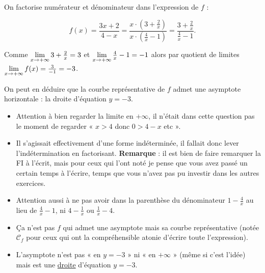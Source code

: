 \documentclass[a4paper,12pt,reqno,french]{article}
\begin{document}
	\begin{correc}
		
		On factorise numérateur et dénominateur	dans l'expression de $f$ :
		
		\[
			f(x) = \frac{3x+2}{4-x} = \frac{x \cdot \left( 3+\frac{2}{x}\right)}{x \cdot \left(\frac{4}{x} - 1\right)} = \frac{3+\frac{2}{x}}{\frac{4}{x} - 1} \text{.}
		\]
		
		Comme $\lim\limits_{x \to +\infty} 3+\frac{2}{x} = 3$ et $\lim\limits_{x \to +\infty} \frac{4}{x} - 1 = -1$ alors par quotient de limites $\lim\limits_{x \to +\infty} f(x) = \frac{3}{-1} = -3$.
		
		On peut en déduire que la courbe représentative de $f$ admet une asymptote horizontale : la droite d'équation $y=-3$.
		
	\end{correc}
	
	\begin{rqs}
			
		\begin{itemize}
			
			\item Attention à bien regarder la limite en $+\infty$, il n'était dans cette question pas le moment de regarder « $x > 4$ donc $0 > 4-x$ etc ».
			
			\item Il s'agissait effectivement d'une forme indéterminée, il fallait donc lever l'indétermination en factorisant. \textbf{Remarque} : il est bien de faire remarquer la FI à l'écrit, mais pour ceux qui l'ont noté je pense que vous avez passé un certain temps à l'écrire, temps que vous n'avez pas pu investir dans les autres exercices.
			
			\item Attention aussi à ne pas avoir dans la parenthèse du dénominateur $1-\frac{4}{x}$ au lieu de $\frac{4}{x}-1$, ni $4-\frac{1}{x}$ ou $\frac{1}{x}-4$.
			
			\item Ça n'est pas $f$ qui admet une asymptote mais sa courbe représentative (notée $\mathscr C_f$ pour ceux qui ont la compréhensible atonie d'écrire toute l'expression).
			
			\item L'asymptote n'est pas « en $y=-3$ » ni « en $+\infty$ » (même si c'est l'idée) mais est une \underline{droite} d'équation $y=-3$.
			
		\end{itemize}
		
	\end{rqs}
	
\end{document}

